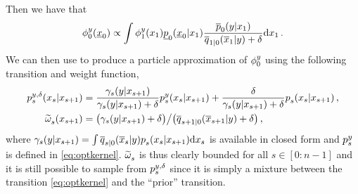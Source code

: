Then we have that 
\begin{equation*}
    \filter{0}{\lmeas}{\lbottomstate_0} \propto \int \filter{1}{\lmeas}{\lstate_1} \bbwtrans{}{0}{\lstate_1}{\lbottomstate_0} \frac{\tbwtrans{}{0}{\lstate_1}{\lmeas}}{\tfwtrans{1|0}{\lmeas}{\ltopstate_1} + \delta} \rmd \lstate_1 \eqsp.
\end{equation*}
 We can then use  to produce a particle approximation of  $\filter{0}{\lmeas}{}$ using the following transition and weight function, 
\begin{align*} 
    \bwopt{s}{\lmeas, \delta}{\lstate_{s+1}}{\lstate_s} & = \frac{\gamma_s(\lmeas | \lstate_{s+1})}{\gamma_s(\lmeas | \lstate_{s+1}) + \delta} \bwopt{s}{\lmeas}{\lstate_{s+1}}{\lstate_s} + \frac{\delta}{\gamma_s(\lmeas | \lstate_{s+1}) + \delta} \bwtrans{}{s}{\lstate_{s+1}}{\lstate_s} \eqsp,  \\
    \uweight{}{s}(\lstate_{s+1}) & = \big( \gamma_s(\lmeas | \lstate_{s+1}) + \delta \big) \big/ \big( \tfwtrans{s+1|0}{\lmeas}{\ltopstate_{s+1}} + \delta \big) \eqsp,
\end{align*}
where $\gamma_s(\lmeas | \lstate_{s+1}) = \int \tfwtrans{s|0}{\lmeas}{\ltopstate_s} \bwtrans{}{s}{\lstate_{s+1}}{\lstate_s} \rmd \lstate_s$ is available in closed form and $\bwopt{s}{\lmeas}{}{}$ is defined in \eqref{eq:optkernel}. $\widetilde{\omega}^{} _{s}$ is thus clearly bounded for all $s \in [0:n-1]$ and it is still possible to sample from $\bwopt{s}{\lmeas, \delta}{}{}$ since it is simply a mixture between the transition \eqref{eq:optkernel} and the ``prior'' transition. 
